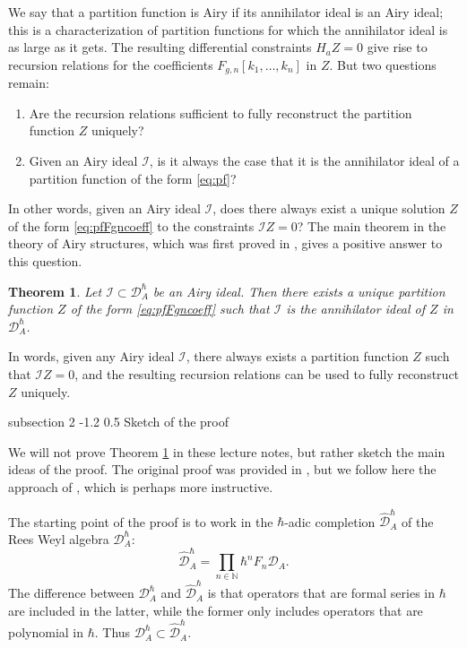 \documentclass[reqno,oneside,11pt]{amsart}
\makeatletter
\theoremstyle{plain}
\newtheorem{theorem}{Theorem}[section]
\theoremstyle{definition}
\theoremstyle{remark}
\numberwithin{equation}{section}
\renewcommand{\subsection}{\@startsection
{subsection}%
{2}%
{\z@}%
{-1.2\baselineskip}%
{0.5\baselineskip}%
{\normalfont \bf \normalsize}} %
\newcommand{\I}{\mathcal{I}}
\newcommand{\DAh}{\mathcal{D}_A^{\hbar}}
\newcommand{\DAhC}{\widehat{\mathcal{D}}_A^{\hbar}}
\makeatother
\begin{document}
We say that a partition function is Airy if its annihilator ideal is an Airy ideal; this is a characterization of partition functions for which the annihilator ideal is as large as it gets. The resulting differential constraints $H_a Z = 0$ give rise to recursion relations for the coefficients $F_{g,n}[k_1,\ldots,k_n]$ in $Z$. But two questions remain:
\begin{enumerate}
\item Are the recursion relations sufficient to fully reconstruct the partition function $Z$ uniquely?
\item Given an Airy ideal $\I$, is it always the case that it is the annihilator ideal of a partition function of the form \eqref{eq:pf}?
\end{enumerate}
In other words, given an Airy ideal $\I$, does there always exist a unique solution $Z$ of the form \eqref{eq:pfFgncoeff} to the constraints $\I Z = 0$? The main theorem in the theory of Airy structures, which was first proved in \cite{KS17}, gives a positive answer to this question.


 \begin{theorem}\label{t:airy}
  Let $\mathcal{I} \subset \DAh$ be an Airy ideal. Then there exists a unique partition function $Z$ of the form \eqref{eq:pfFgncoeff} such that $\mathcal{I}$ is the annihilator ideal of $Z$ in $\DAh$.
 \end{theorem}
 
 In words, given any Airy ideal $\I$, there always exists a partition function $Z$ such that $\I Z =0$, and the resulting recursion relations can be used to fully reconstruct $Z$ uniquely.
 
\subsection{Sketch of the proof}

We will not prove Theorem \ref{t:airy} in these lecture notes, but rather sketch the main ideas of the proof. The original proof was provided in \cite{KS17}, but we follow here the approach of \cite{BCJ22}, which is perhaps more instructive.

The starting point of the proof is to work in the $\hbar$-adic completion $\DAhC$ of the Rees Weyl algebra $\DAh$:
\begin{equation}
\DAhC = \prod_{n \in \mathbb{N}} \hbar^n F_n \mathcal{D}_A.
\end{equation}
The difference between $\DAh$ and $\DAhC$ is that operators that are formal series in $\hbar$ are included in the latter, while the former only includes operators that are polynomial in $\hbar$. Thus $\DAh \subset \DAhC$.
\end{document}
